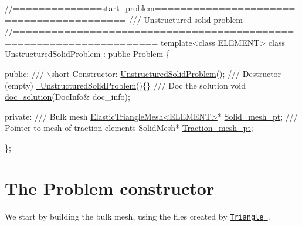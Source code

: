  
\begin{DoxyCodeInclude}
\textcolor{comment}{//==============start\_problem=========================================}
\textcolor{comment}{/// Unstructured solid problem}
\textcolor{comment}{}\textcolor{comment}{//====================================================================}
\textcolor{keyword}{template}<\textcolor{keyword}{class} ELEMENT> 
\textcolor{keyword}{class }\hyperlink{classUnstructuredSolidProblem}{UnstructuredSolidProblem} : \textcolor{keyword}{public} Problem
\{

\textcolor{keyword}{public}:
\textcolor{comment}{}
\textcolor{comment}{ /// \(\backslash\)short Constructor: }
\textcolor{comment}{} \hyperlink{classUnstructuredSolidProblem_a18ce02b6e4bbc86403c9e1b32c095772}{UnstructuredSolidProblem}();
\textcolor{comment}{}
\textcolor{comment}{ /// Destructor (empty)}
\textcolor{comment}{} \hyperlink{classUnstructuredSolidProblem_a25fe105d949498bf8f7c15aff96a7d00}{~UnstructuredSolidProblem}()\{\}
 \textcolor{comment}{}
\textcolor{comment}{ /// Doc the solution}
\textcolor{comment}{} \textcolor{keywordtype}{void} \hyperlink{classUnstructuredSolidProblem_ab3d66fd61b69d12b4f159d763fc44f15}{doc\_solution}(DocInfo& doc\_info);
 
\textcolor{keyword}{private}:
 \textcolor{comment}{}
\textcolor{comment}{ /// Bulk mesh}
\textcolor{comment}{} \hyperlink{classElasticTriangleMesh}{ElasticTriangleMesh<ELEMENT>}* \hyperlink{classUnstructuredSolidProblem_a09c0a07feb1586f2cca3766b4ac92099}{Solid\_mesh\_pt};
 \textcolor{comment}{}
\textcolor{comment}{ /// Pointer to mesh of traction elements}
\textcolor{comment}{} SolidMesh* \hyperlink{classUnstructuredSolidProblem_ade114e509464031ba8657600584b9743}{Traction\_mesh\_pt};

\};

\end{DoxyCodeInclude}




 

\hypertarget{index_constructor}{}\section{The Problem constructor}\label{index_constructor}
We start by building the bulk mesh, using the files created by \href{http://www.cs.cmu.edu/~quake/triangle.html}{\tt {\ttfamily Triangle} }.


